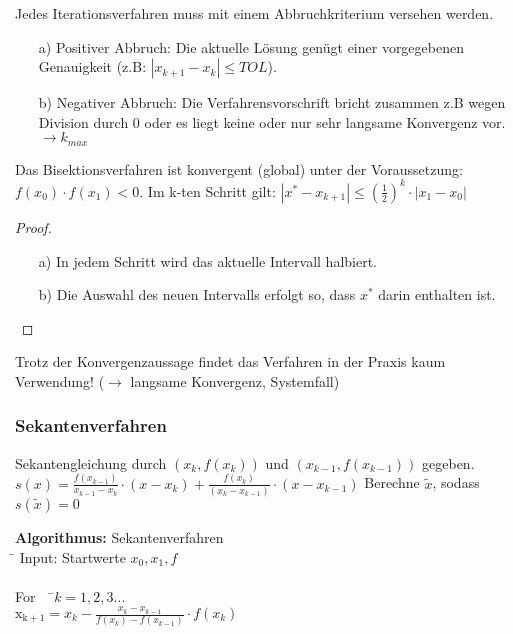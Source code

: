 \begin{bemerkung}
Jedes Iterationsverfahren muss mit einem Abbruchkriterium versehen werden.
\end{bemerkung}


\begin{enumerate}
\item[a)] Positiver Abbruch: Die aktuelle Lösung genügt einer vorgegebenen Genauigkeit
      (z.B: $|x_{k+1}-x_k|\leq TOL$).
\item[b)] Negativer Abbruch: Die Verfahrensvorschrift bricht zusammen z.B wegen Division durch 0
      oder es liegt keine oder nur sehr langsame Konvergenz vor. $\rightarrow k_{max}$
\end{enumerate}

\begin{lemma}
Das Bisektionsverfahren ist konvergent (global) unter der Voraussetzung:
$f(x_0) \cdot f(x_1) <0$. Im k-ten Schritt gilt: $|x^*-x_{k+1}|\leq
(\frac{1}{2})^k \cdot |x_1-x_0|$ 
\end{lemma}

\begin{proof}
~
\begin{enumerate}
\item[a)] In jedem Schritt wird das aktuelle Intervall halbiert. 
\item[b)] Die Auswahl des neuen Intervalls erfolgt so, dass $x^*$ darin enthalten ist.
\end{enumerate}
\end{proof}

Trotz der Konvergenzaussage findet das Verfahren in der Praxis kaum Verwendung!
($\rightarrow$ langsame Konvergenz, Systemfall)

\subsubsection{Sekantenverfahren}

Sekantengleichung durch $(x_k, f(x_k))$ und $(x_{k-1}, f(x_{k-1}))$ gegeben.
\newline
$s(x)=\frac{f(x_{k-1})}{x_{k-1}-x_k} \cdot (x-x_k)+\frac{f(x_k)}{(x_k-x_{k-1})}\cdot (x-x_{k-1})$
\newline
Berechne $\tilde x$, sodass $s(\tilde x)=0$

\begin{tabbing}
\textbf{Algorithmus:} Sekantenverfahren\\
\= \kill
Input: Startwerte $x_0, x_1, f$\\
\newline
\\\> For \ \ \=$k=1,2,3...$\\ 
\> \> $\mathrm{x_{k+1}}= x_k - \frac{x_k-x_{k-1}}{f(x_k)-f(x_{k-1})} \cdot f(x_k)$ \\
\end{tabbing}


